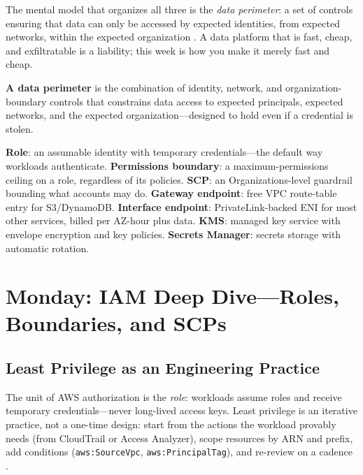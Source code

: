 The mental model that organizes all three is the \emph{data perimeter}: a set of controls ensuring that data can only be accessed by expected identities, from expected networks, within the expected organization \cite{awsIAMDocs}. A data platform that is fast, cheap, and exfiltratable is a liability; this week is how you make it merely fast and cheap.

\begin{definitionbox}
\textbf{A data perimeter} is the combination of identity, network, and organization-boundary controls that constrains data access to expected principals, expected networks, and the expected organization---designed to hold even if a credential is stolen.
\end{definitionbox}

\begin{keyterms}
\textbf{Role}: an assumable identity with temporary credentials---the default way workloads authenticate. \textbf{Permissions boundary}: a maximum-permissions ceiling on a role, regardless of its policies. \textbf{SCP}: an Organizations-level guardrail bounding what accounts may do. \textbf{Gateway endpoint}: free VPC route-table entry for S3/DynamoDB. \textbf{Interface endpoint}: PrivateLink-backed ENI for most other services, billed per AZ-hour plus data. \textbf{KMS}: managed key service with envelope encryption and key policies. \textbf{Secrets Manager}: secrets storage with automatic rotation.
\end{keyterms}

\section{Monday: IAM Deep Dive---Roles, Boundaries, and SCPs}
\subsection{Least Privilege as an Engineering Practice}
The unit of AWS authorization is the \emph{role}: workloads assume roles and receive temporary credentials---never long-lived access keys. Least privilege is an iterative practice, not a one-time design: start from the actions the workload provably needs (from CloudTrail or Access Analyzer), scope resources by ARN and prefix, add conditions (\texttt{aws:SourceVpc}, \texttt{aws:PrincipalTag}), and re-review on a cadence \cite{awsIAMDocs}.

